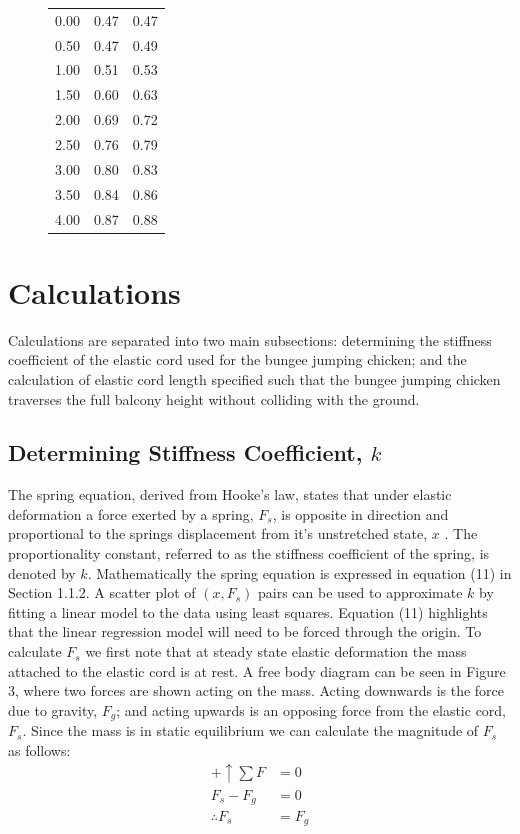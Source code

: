 \documentclass[a4paper]{article}
\newlength{\arrow}
\begin{document}
\begin{figure}[h]
\begin{minipage}{0.45\textwidth}
\begin{tabular}{rrr}
				\midrule
				0.00 & 0.47 & 0.47\\
				0.50 & 0.47 & 0.49\\
				1.00 & 0.51 & 0.53\\
				1.50 & 0.60 & 0.63\\
				2.00 & 0.69 & 0.72\\
				2.50 & 0.76 & 0.79\\
				3.00 & 0.80 & 0.83\\
				3.50 & 0.84 & 0.86\\
				4.00 & 0.87 & 0.88\\
				\bottomrule
			\end{tabular}
	\end{minipage}
\end{figure}


\section{Calculations}
Calculations are separated into two main subsections: determining the stiffness coefficient of the elastic cord used for the bungee jumping chicken; and the calculation of elastic cord length specified such that the bungee jumping chicken traverses the full balcony height without colliding with the ground.

\subsection{Determining Stiffness Coefficient, $k$}
The spring equation, derived from Hooke's law, states that under elastic deformation a force exerted by a spring, $F_s$, is opposite in direction and proportional to the springs displacement from it's unstretched state, $x$ \cite{Giancoli:2000}. The proportionality constant, referred to as the stiffness coefficient of the spring, is denoted by $k$. Mathematically the spring equation is expressed in equation (11) in Section 1.1.2. A scatter plot of $(x, F_s)$ pairs can be used to approximate $k$ by fitting a linear model to the data using least squares. Equation (11) highlights that the linear regression model will need to be forced through the origin. To calculate $F_s$ we first note that at steady state elastic deformation the mass attached to the elastic cord is at rest. A free body diagram can be seen in Figure 3, where two forces are shown acting on the mass. Acting downwards is the force due to gravity, $F_g$; and acting upwards is an opposing force from the elastic cord, $F_s$. Since the mass is in static equilibrium we can calculate the magnitude of $F_s$ as follows:
\begin{align}
+ \uparrow \sum F &= 0 \nonumber \\
F_s - F_g &= 0 \nonumber \\
\therefore F_s &= F_g
\end{align} 
\end{document}
